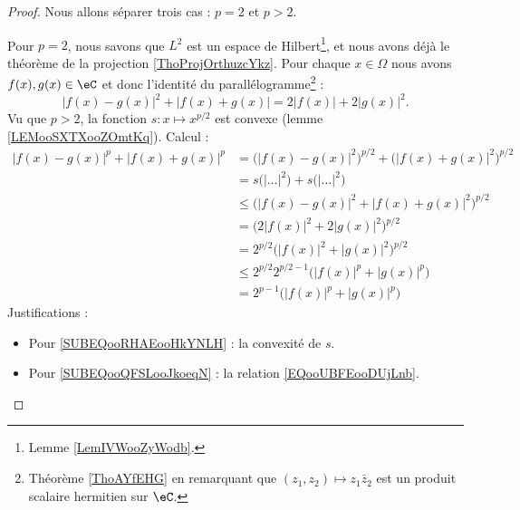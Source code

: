 	\begin{proof}
		Nous allons séparer trois cas : \( p=2\) et \( p>2\).
		\begin{subproof}
			\spitem[\( p=2\)]
			Pour \( p=2\), nous savons que \( L^2\) est un espace de Hilbert\footnote{Lemme \ref{LemIVWooZyWodb}.}, et nous avons déjà le théorème de la projection \ref{ThoProjOrthuzcYkz}.
			\spitem[\( p>2\)]
			Pour chaque \( x\in \Omega\) nous avons \( f(x), g(x)\in \eC\) et donc l'identité du parallélogramme\footnote{Théorème \ref{ThoAYfEHG} en remarquant que \( (z_1,z_2)\mapsto z_1\bar z_2\) est un produit scalaire hermitien sur \( \eC\).} :
			\begin{equation}        \label{EQooUBFEooDUjLnb}
				\big| f(x)-g(x) \big|^2+\big| f(x)+g(x) \big|=2| f(x) |+2| g(x) |^2.
			\end{equation}
			Vu que \( p>2\), la fonction \( s\colon x\mapsto  x^{p/2}\) est convexe (lemme \ref{LEMooSXTXooZOmtKq}). Calcul :
			\begin{subequations}
				\begin{align}
					| f(x)-g(x) |^p+| f(x)+g(x) |^p & =\big( | f(x)-g(x) |^2 \big)^{p/2}+\big( | f(x)+g(x) |^2 \big)^{p/2}                    \\
					                                & =s\big( | \ldots |^2 \big)+s\big( | \ldots |^2 \big)                                    \\
					                                & \leq \big( | f(x)-g(x) |^2+| f(x)+g(x) |^2 \big)^{p/2}     \label{SUBEQooRHAEooHkYNLH}  \\
					                                & =\big( 2| f(x) |^2+2| g(x) |^2 \big)^{p/2}                 \label{SUBEQooQFSLooJkoeqN}  \\
					                                & =2^{p/2}\big( | f(x) |^2+| g(x) |^2 \big)^{p/2}                                         \\
					                                & \leq  2^{p/2}2^{p/2-1}\big( | f(x) |^p+| g(x) |^p \big)     \label{SUBEQooQSUHooXKaWwO} \\
					                                & =2^{p-1}\big( | f(x) |^p+| g(x) |^p \big)
				\end{align}
			\end{subequations}
			Justifications :
			\begin{itemize}
				\item Pour \eqref{SUBEQooRHAEooHkYNLH} : la convexité de \( s\).
				\item Pour \eqref{SUBEQooQFSLooJkoeqN} : la relation \eqref{EQooUBFEooDUjLnb}.

\end{itemize}
\end{subproof}
\end{proof}

